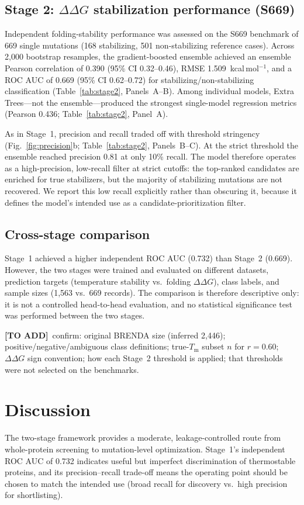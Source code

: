 \documentclass[11pt]{article}
\newcommand{\fillerblock}[1]{%
  \par\smallskip\noindent
  \colorbox{filleryellow}{\parbox{\dimexpr\linewidth-2\fboxsep\relax}{%
    \small\textbf{[TO ADD]}\ #1}}\par\smallskip}
\newcommand{\ddg}{\ensuremath{\Delta\Delta G}}
\newcommand{\Tm}{\ensuremath{T_\mathrm{m}}}
\begin{document}
\subsection{Stage 2: \texorpdfstring{\ddg}{ddG} stabilization performance (S669)}
Independent folding-stability performance was assessed on the S669 benchmark of 669 single
mutations (168 stabilizing, 501 non-stabilizing reference cases). Across 2{,}000 bootstrap
resamples, the gradient-boosted ensemble achieved an ensemble Pearson correlation of 0.390 (95\%
CI 0.32--0.46), RMSE 1.509~kcal\,mol$^{-1}$, and a ROC AUC of 0.669 (95\% CI 0.62--0.72) for
stabilizing/non-stabilizing classification (Table~\ref{tab:stage2}, Panels~A--B). Among
individual models, Extra Trees---not the ensemble---produced the strongest single-model
regression metrics (Pearson 0.436; Table~\ref{tab:stage2}, Panel~A).

As in Stage~1, precision and recall traded off with threshold stringency
(Fig.~\ref{fig:precision}b; Table~\ref{tab:stage2}, Panels~B--C). At the strict threshold the
ensemble reached precision 0.81 at only 10\% recall. The model therefore operates as a
high-precision, low-recall filter at strict cutoffs: the top-ranked candidates are enriched for
true stabilizers, but the majority of stabilizing mutations are not recovered. We report this low
recall explicitly rather than obscuring it, because it defines the model's intended use as a
candidate-prioritization filter.

\subsection{Cross-stage comparison}
Stage~1 achieved a higher independent ROC AUC (0.732) than Stage~2 (0.669). However, the two
stages were trained and evaluated on different datasets, prediction targets (temperature
stability vs.\ folding \ddg), class labels, and sample sizes (1{,}563 vs.\ 669 records). The
comparison is therefore descriptive only: it is not a controlled head-to-head evaluation, and no
statistical significance test was performed between the two stages.
\fillerblock{confirm: original BRENDA size (inferred 2{,}446); positive/negative/ambiguous class definitions; true-\Tm{} subset $n$ for $r=0.60$; \ddg{} sign convention; how each Stage~2 threshold is applied; that thresholds were not selected on the benchmarks.}

\section{Discussion}
The two-stage framework provides a moderate, leakage-controlled route from whole-protein
screening to mutation-level optimization. Stage~1's independent ROC AUC of 0.732 indicates useful
but imperfect discrimination of thermostable proteins, and its precision--recall trade-off means
the operating point should be chosen to match the intended use (broad recall for discovery vs.\
high precision for shortlisting).
\end{document}
